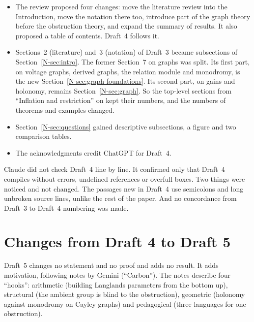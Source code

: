 \documentclass[12pt,letterpaper]{article}
\begin{document}
\begin{itemize}[itemsep=1pt]
\item The review proposed four changes: move the literature review into
  the Introduction, move the notation there too, introduce part of the
  graph theory before the obstruction theory, and expand the summary of
  results. It also proposed a table of contents. Draft~4 follows it.
\item Sections~2 (literature) and~3 (notation) of Draft~3 became
  subsections of Section~\ref{N-sec:intro}. The former Section~7 on
  graphs was split. Its first part, on voltage graphs, derived graphs,
  the relation module and monodromy, is the new
  Section~\ref{N-sec:graph-foundations}. Its second part, on gains and
  holonomy, remains Section~\ref{N-sec:graph}. So the top-level sections
  from ``Inflation and restriction'' on kept their numbers, and the
  numbers of theorems and examples changed.
\item Section~\ref{N-sec:questions} gained descriptive subsections, a
  figure and two comparison tables.
\item The acknowledgments credit ChatGPT for Draft~4.
\end{itemize}
Claude did not check Draft~4 line by line. It confirmed only that
Draft~4 compiles without errors, undefined references or overfull
boxes. Two things were noticed and not changed. The passages new in
Draft~4 use semicolons and long unbroken source lines, unlike the rest
of the paper. And no concordance from Draft~3 to Draft~4 numbering was
made.

\section{Changes from Draft 4 to Draft 5}\label{sec:d4d5}

Draft~5 changes no statement and no proof and adds no result. It adds
motivation, following notes by Gemini (``Carbon''). The notes describe
four ``hooks'': arithmetic (building Langlands parameters from the bottom
up), structural (the ambient group is blind to the obstruction),
geometric (holonomy against monodromy on Cayley graphs) and pedagogical
(three languages for one obstruction).
\end{document}
